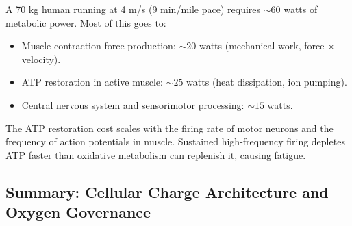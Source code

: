 \begin{example}
\label{ex:running-cost}
A 70 kg human running at 4 m/s (9 min/mile pace) requires $\sim 60$ watts of metabolic power. Most of this goes to:
\begin{itemize}[noitemsep]
\item Muscle contraction force production: $\sim 20$ watts (mechanical work, force $\times$ velocity).
\item ATP restoration in active muscle: $\sim 25$ watts (heat dissipation, ion pumping).
\item Central nervous system and sensorimotor processing: $\sim 15$ watts.
\end{itemize}

The ATP restoration cost scales with the firing rate of motor neurons and the frequency of action potentials in muscle. Sustained high-frequency firing depletes ATP faster than oxidative metabolism can replenish it, causing fatigue.
\end{example}

\subsection{Summary: Cellular Charge Architecture and Oxygen Governance}
\label{subsec:cellular-summary}

